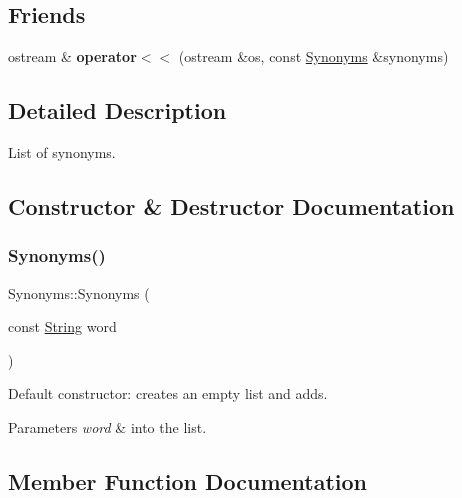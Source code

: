 \subsection*{Friends}
\begin{DoxyCompactItemize}
\item 
\mbox{\label{classSynonyms_a6ee5cdecaeba3d88a245f0b9db2d2758}} 
ostream \& {\bfseries operator$<$$<$} (ostream \&os, const \mbox{\hyperlink{classSynonyms}{Synonyms}} \&synonyms)
\end{DoxyCompactItemize}


\subsection{Detailed Description}
List of synonyms. 

\subsection{Constructor \& Destructor Documentation}
\mbox{\label{classSynonyms_ac3bc326580cfe3de1bab88d71e5dcaed}} 
\subsubsection{\texorpdfstring{Synonyms()}{Synonyms()}}
{\footnotesize\ttfamily Synonyms\+::\+Synonyms (\begin{DoxyParamCaption}\item[{const \mbox{\hyperlink{classString}{String}}}]{word }\end{DoxyParamCaption})}



Default constructor\+: creates an empty list and adds. 


\begin{DoxyParams}{Parameters}
{\em word} & into the list. \\
\hline
\end{DoxyParams}


\subsection{Member Function Documentation}
\mbox{\label{classSynonyms_abe26e020a2d097a225bc0527253d9c63}} 
